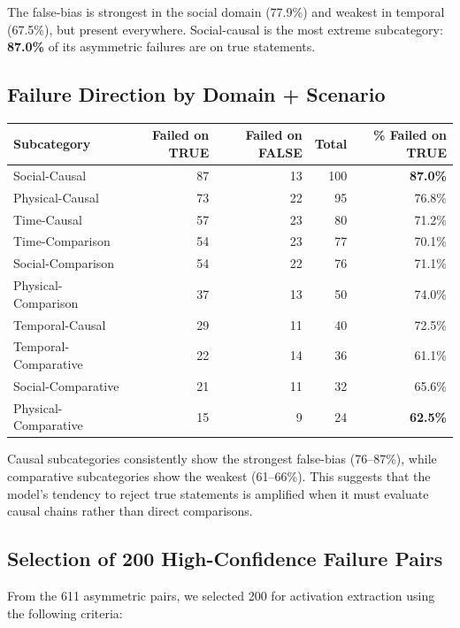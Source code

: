 \documentclass[11pt]{article}
\begin{document}
The false-bias is strongest in the social domain (77.9\%) and weakest in temporal (67.5\%), but present everywhere. Social-causal is the most extreme subcategory: \textbf{87.0\%} of its asymmetric failures are on true statements.

\subsection*{Failure Direction by Domain + Scenario}

\begin{center}
\begin{tabular}{l r r r r}
\toprule
\textbf{Subcategory} & \textbf{Failed on TRUE} & \textbf{Failed on FALSE} & \textbf{Total} & \textbf{\% Failed on TRUE} \\
\midrule
Social-Causal       & 87 & 13 & 100 & \textbf{87.0\%} \\
Physical-Causal     & 73 & 22 &  95 & 76.8\% \\
Time-Causal         & 57 & 23 &  80 & 71.2\% \\
Time-Comparison     & 54 & 23 &  77 & 70.1\% \\
Social-Comparison   & 54 & 22 &  76 & 71.1\% \\
Physical-Comparison & 37 & 13 &  50 & 74.0\% \\
Temporal-Causal     & 29 & 11 &  40 & 72.5\% \\
Temporal-Comparative& 22 & 14 &  36 & 61.1\% \\
Social-Comparative  & 21 & 11 &  32 & 65.6\% \\
Physical-Comparative& 15 &  9 &  24 & \textbf{62.5\%} \\
\bottomrule
\end{tabular}
\end{center}

Causal subcategories consistently show the strongest false-bias (76--87\%), while comparative subcategories show the weakest (61--66\%). This suggests that the model's tendency to reject true statements is amplified when it must evaluate causal chains rather than direct comparisons.

\subsection*{Selection of 200 High-Confidence Failure Pairs}

From the 611 asymmetric pairs, we selected 200 for activation extraction using the following criteria:
\end{document}
